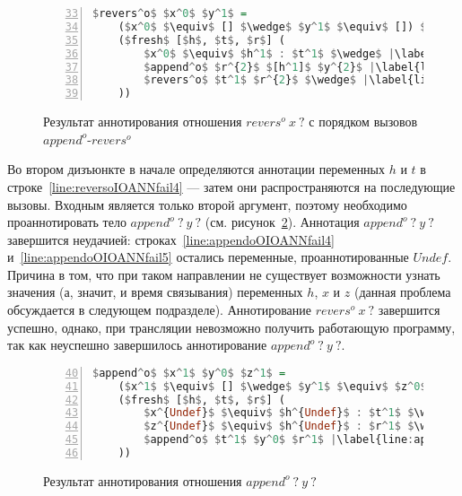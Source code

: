 \begin{figure}[h!]
  \begin{center}
  \begin{minipage}{0.35\textwidth}
  \begin{lstlisting}[language=Haskell, frame=single, numbers=left,numberstyle=\small, firstnumber=33, escapechar=|]
  $revers^o$ $x^0$ $y^1$ =
    ($x^0$ $\equiv$ [] $\wedge$ $y^1$ $\equiv$ []) $\vee$ |\label{line:reversoIOANNfail2}|
    ($fresh$ [$h$, $t$, $r$] (
        $x^0$ $\equiv$ $h^1$ : $t^1$ $\wedge$ |\label{line:reversoIOANNfail4}|
        $append^o$ $r^{2}$ $[h^1]$ $y^{2}$ |\label{line:reversoIOANNfail5}|
        $revers^o$ $t^1$ $r^{2}$ $\wedge$ |\label{line:reversoIOANNfail6}|
    ))
    \end{lstlisting}
  \end{minipage}
  \end{center}
  \caption{Результат аннотирования отношения $revers^o \ x \ ?$ с порядком вызовов $append^o$-$revers^o$}
  \label{lst:reversoIOANNfail}
\end{figure}

Во втором дизъюнкте в начале определяются аннотации переменных $h$ и $t$ в строке~\ref{line:reversoIOANNfail4} --- затем они распространяются на последующие вызовы.
Входным является только второй аргумент, поэтому необходимо проаннотировать тело $append^o \ ? \ y \ ?$ (см. рисунок~\ref{lst:appendoOIOANNfail}).
Аннотация $append^o \ ? \ y \ ?$ завершится неудачией: строках~\ref{line:appendoOIOANNfail4} и~\ref{line:appendoOIOANNfail5} остались переменные, проаннотированные $Undef$.
Причина в том, что при таком направлении не существует возможности узнать значения (а, значит, и время связывания) переменных $h$, $x$ и $z$ (данная проблема обсуждается в следующем подразделе).
Аннотирование $revers^o \ x \ ?$ завершится успешно, однако, при трансляции невозможно получить работающую программу, так как неуспешно завершилось аннотирование $append^o \ ? \ y \ ?$. 

\begin{figure}[h!]
  \begin{center}
  \begin{minipage}{0.40\textwidth}
  \begin{lstlisting}[language=Haskell, frame=single, numbers=left,numberstyle=\small, firstnumber=40, escapechar=|]
  $append^o$ $x^1$ $y^0$ $z^1$ =
    ($x^1$ $\equiv$ [] $\wedge$ $y^1$ $\equiv$ $z^0$) $\vee$ |\label{line:appendoOIOANNfail2}|
    ($fresh$ [$h$, $t$, $r$] (
        $x^{Undef}$ $\equiv$ $h^{Undef}$ : $t^1$ $\wedge$ |\label{line:appendoOIOANNfail4}|
        $z^{Undef}$ $\equiv$ $h^{Undef}$ : $r^1$ $\wedge$ |\label{line:appendoOIOANNfail5}|
        $append^o$ $t^1$ $y^0$ $r^1$ |\label{line:appendoOIOANNfail6}|
    ))
    \end{lstlisting}
  \end{minipage}
  \end{center}
  \caption{Результат аннотирования отношения $append^o \ ? \ y \ ?$}
  \label{lst:appendoOIOANNfail}
\end{figure}

